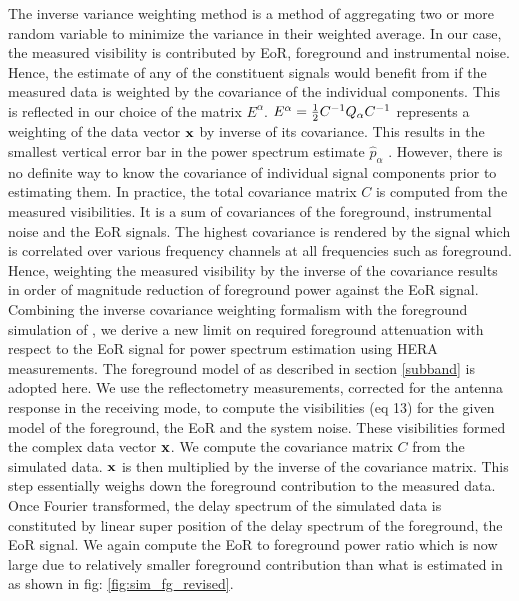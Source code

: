 \documentclass[twocolumn]{emulateapj}
\begin{document}
    The inverse variance weighting method is a method of aggregating two or more
    random variable to minimize the variance in their weighted average. In our
    case, the measured visibility is contributed by EoR, foreground and
    instrumental noise. Hence, the estimate of any of the constituent signals would
    benefit from if the measured data is weighted by the covariance of the
    individual components. This is reflected in our choice of the matrix
    $E^{\alpha}$.  $E^{\alpha} = {1 \over 2} C^{-1} Q_{\alpha} C^{-1}$ represents a
    weighting of the data vector $\bold x$ by inverse of its covariance. This
    results in the smallest vertical error bar in the power spectrum estimate $\hat
    p_{\alpha}$ \citep{liu_tegmark2011}.  However, there is no definite way to know the
    covariance of individual signal components prior to estimating them. In
    practice, the total covariance matrix $C$ is computed from the measured
    visibilities. It is a sum of covariances of the foreground, instrumental noise
    and the EoR signals. The highest covariance is rendered by the signal which is
    correlated over various frequency channels at all frequencies such as
    foreground. Hence, weighting the measured visibility by the inverse of the
    covariance results in order of magnitude reduction of foreground power against
    the EoR signal. \\ 
    Combining the inverse covariance weighting formalism with the
    foreground simulation of \cite{Thyagarajan_et_al2016}, we derive a new limit on
    required foreground attenuation with respect to the EoR signal for
    power spectrum estimation using HERA measurements. The foreground model of
    \cite{Thyagarajan_et_al2016} as described in section \ref{subband} is adopted here. We use
    the reflectometry measurements, corrected for the antenna response in the
    receiving mode, to compute the visibilities (eq 13) for the given model of the
    foreground, the EoR and the system noise. These visibilities formed the complex
    data vector $\bold x$. We compute the covariance matrix $C$ from the simulated
    data. $\bold x$ is then multiplied by the inverse of the covariance matrix.
    This step essentially weighs down the foreground contribution to the measured
    data. Once Fourier transformed, the delay spectrum of the simulated data is
    constituted by linear super position of the delay spectrum of the foreground,
    the EoR signal.  We again compute the EoR to foreground power ratio which is
    now large due to relatively smaller foreground contribution than what is estimated in \cite{Thyagarajan_et_al2016} as shown       in fig: \ref{fig:sim_fg_revised}. 
    
\end{document}
